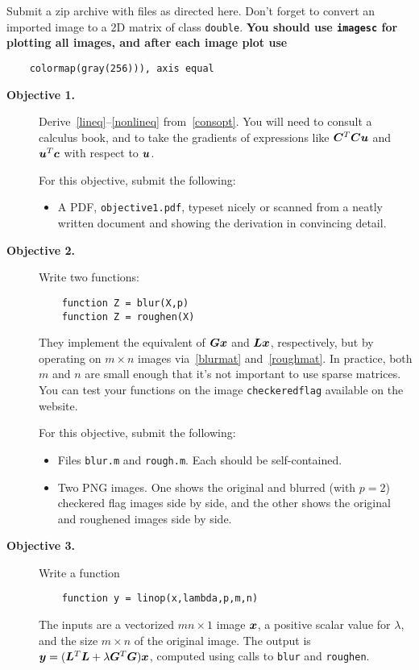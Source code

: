 \documentclass[11pt,letterpaper]{article}
\begin{document}
Submit a zip archive with files as directed here. Don't forget to convert an imported image to a 2D matrix of class \texttt{double}. \textbf{You should use \texttt{imagesc} for plotting all images, and after each image plot use}
\begin{verbatim}
    colormap(gray(256))), axis equal
\end{verbatim}

\begin{description}
\item[\textbf{Objective 1.}] Derive~\eqref{lineq}--\eqref{nonlineq} from~\eqref{consopt}. You will need to consult a calculus book, and to take the gradients of expressions like $\bm{C}^T \bm{C} \bm{u}$ and $\bm{u}^T \bm{c}$ with respect to $\bm{u}$. 

For this objective, submit the following:
\begin{itemize}
\item A PDF, \texttt{objective1.pdf}, typeset nicely or scanned from a neatly written document and showing the derivation in convincing detail.
\end{itemize}

\item[\textbf{Objective 2.}]  Write two functions:
\begin{verbatim}
    function Z = blur(X,p)
    function Z = roughen(X)
\end{verbatim}
They implement the equivalent of $\bm{G}\bm{x}$ and $\bm{L}\bm{x}$, respectively, but by operating on $m\times n$ images via~\eqref{blurmat} and~\eqref{roughmat}. In practice, both $m$ and $n$ are small enough that it's not important to use sparse matrices. 
You can test your functions on the image \texttt{checkeredflag} available on the website. 

For this objective, submit the following:
\begin{itemize}
\item Files \texttt{blur.m} and \texttt{rough.m}. Each should be self-contained. 
\item Two PNG images. One shows the original and blurred (with $p=2$) checkered flag images side by side, and the other shows the original and roughened images side by side. 
\end{itemize}

\item[\textbf{Objective 3.}] Write a function
\begin{verbatim}
    function y = linop(x,lambda,p,m,n)
\end{verbatim}
The inputs are a vectorized $mn\times 1$ image $\bm{x}$, a positive scalar value for $\lambda$, and the size $m\times n$ of the original image. The output is $\bm{y}=(\bm{L}^T\bm{L} + \lambda \bm{G}^T\bm{G})\bm{x}$, computed using calls to \texttt{blur} and \texttt{roughen}.


\end{description}
\end{document}
